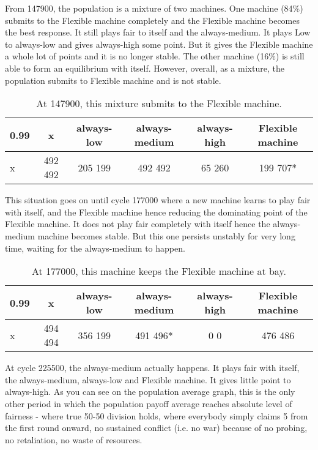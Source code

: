 \documentclass[12.5pt]{report}
\begin{document}
From 147900, the population is a mixture of two machines. One machine (84\%) submits to the Flexible machine completely and the Flexible machine becomes the best response. It still plays fair to itself and the always-medium. It plays Low to always-low and gives always-high some point. But it gives the Flexible machine a whole lot of points and it is no longer stable. The other machine (16\%) is still able to form an equilibrium with itself. However, overall, as a mixture, the population submits to Flexible machine and is not stable.

\begin{table}[h!]
\center
\begin{tabular}{l|ccccc}
\textbf{0.99}& x & always-low & always-medium & always-high & Flexible machine\\
\hline

x & 492 492 & 205 199  &  492 492  & 65 260  &  199 707*  \\
\end{tabular}
\caption{At 147900, this mixture submits to the Flexible machine.}
\end{table}

This situation goes on until cycle 177000 where a new machine learns to play fair with itself, and the Flexible machine hence reducing the dominating point of the Flexible machine. It does not play fair completely with itself hence the always-medium machine becomes stable. But this one persists unstably for very long time, waiting for the always-medium to happen.

\begin{table}[h!]
\center
\begin{tabular}{l|ccccc}
\textbf{0.99}& x & always-low & always-medium & always-high & Flexible machine\\
\hline

x & 494 494 & 356 199  &  491 496*  & 0 0  &  476 486  \\
\end{tabular}
\caption{At 177000, this machine keeps the Flexible machine at bay.}
\end{table}

At cycle 225500, the always-medium actually happens. It plays fair with itself, the always-medium, always-low and Flexible machine. It gives little point to always-high. As you can see on the population average graph, this is the only other period in which the population payoff average reaches absolute level of fairness - where true 50-50 division holds, where everybody simply claims 5 from the first round onward, no sustained conflict (i.e. no war) because of no probing, no retaliation, no waste of resources.
\end{document}
